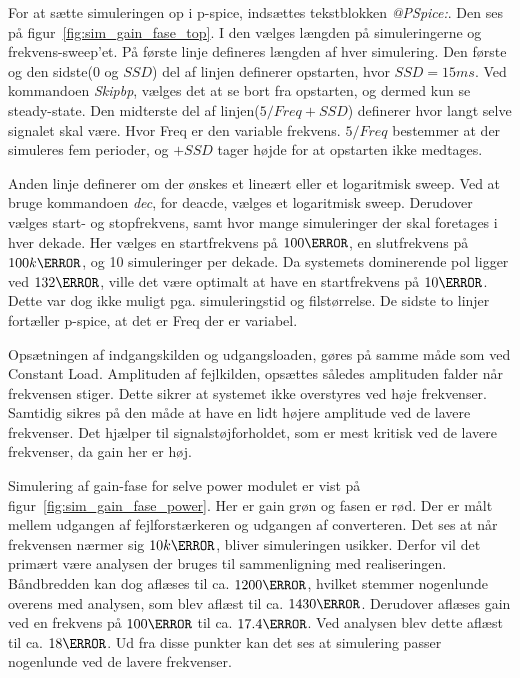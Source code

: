 For at sætte simuleringen op i p-spice, indsættes tekstblokken \textit{@PSpice:}. Den ses på figur~\ref{fig:sim_gain_fase_top}. I den vælges længden på simuleringerne og frekvens-sweep'et. På første linje defineres længden af hver simulering. Den første og den sidste($0$ og $SSD$) del af linjen definerer opstarten, hvor $SSD=15ms$. Ved kommandoen \textit{Skipbp}, vælges det at se bort fra opstarten, og dermed kun se steady-state. Den midterste del af linjen($5/Freq+SSD$) definerer hvor langt selve signalet skal være. Hvor Freq er den variable frekvens. $5/Freq$ bestemmer at der simuleres fem perioder, og $+SSD$ tager højde for at opstarten ikke medtages. 

Anden linje definerer om der ønskes et lineært eller et logaritmisk sweep. Ved at bruge kommandoen \textit{dec}, for deacde, vælges et logaritmisk sweep. Derudover vælges start- og stopfrekvens, samt hvor mange simuleringer der skal foretages i hver dekade. Her vælges en startfrekvens på $100\hertz$, en slutfrekvens på $100k\hertz$, og 10 simuleringer per dekade. Da systemets dominerende pol ligger ved $132\hertz$, ville det være optimalt at have en startfrekvens på $10\hertz$. Dette var dog ikke muligt pga. simuleringstid og filstørrelse. De sidste to linjer fortæller p-spice, at det er Freq der er variabel. 

Opsætningen af indgangskilden og udgangsloaden, gøres på samme måde som ved Constant Load. Amplituden af fejlkilden, opsættes således amplituden falder når frekvensen stiger. Dette sikrer at systemet ikke overstyres ved høje frekvenser. Samtidig sikres på den måde at have en lidt højere amplitude ved de lavere frekvenser. Det hjælper til signalstøjforholdet, som er mest kritisk ved de lavere frekvenser, da gain her er høj\cite{evalgp}.

Simulering af gain-fase for selve power modulet er vist på figur~\ref{fig:sim_gain_fase_power}. Her er gain grøn og fasen er rød. Der er målt mellem udgangen af fejlforstærkeren og udgangen af converteren. Det ses at når frekvensen nærmer sig $10k\hertz$, bliver simuleringen usikker. Derfor vil det primært være analysen der bruges til sammenligning med realiseringen. Båndbredden kan dog aflæses til ca. $1200\hertz$, hvilket stemmer nogenlunde overens med analysen, som blev aflæst til ca. $1430\hertz$. Derudover aflæses gain ved en frekvens på $100\hertz$ til ca. $17.4\decibel$. Ved analysen blev dette aflæst til ca. $18\decibel$. Ud fra disse punkter kan det ses at simulering passer nogenlunde ved de lavere frekvenser. 

